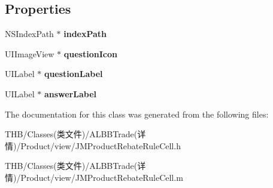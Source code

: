 \subsection*{Properties}
\begin{DoxyCompactItemize}
\item 
\mbox{\label{interface_j_m_product_rebate_rule_cell_aa154d9a6374a59438057aa6e32f8554f}} 
N\+S\+Index\+Path $\ast$ {\bfseries index\+Path}
\item 
\mbox{\label{interface_j_m_product_rebate_rule_cell_ac3ecd99d39510b88a4a08b07b55656a9}} 
U\+I\+Image\+View $\ast$ {\bfseries question\+Icon}
\item 
\mbox{\label{interface_j_m_product_rebate_rule_cell_a51f9a24eeb09f0b83adc5a1c77324fc1}} 
U\+I\+Label $\ast$ {\bfseries question\+Label}
\item 
\mbox{\label{interface_j_m_product_rebate_rule_cell_a8d80bfb193630aff08010853a590d7f8}} 
U\+I\+Label $\ast$ {\bfseries answer\+Label}
\end{DoxyCompactItemize}


The documentation for this class was generated from the following files\+:\begin{DoxyCompactItemize}
\item 
T\+H\+B/\+Classes(类文件)/\+A\+L\+B\+B\+Trade(详情)/\+Product/view/J\+M\+Product\+Rebate\+Rule\+Cell.\+h\item 
T\+H\+B/\+Classes(类文件)/\+A\+L\+B\+B\+Trade(详情)/\+Product/view/J\+M\+Product\+Rebate\+Rule\+Cell.\+m\end{DoxyCompactItemize}
